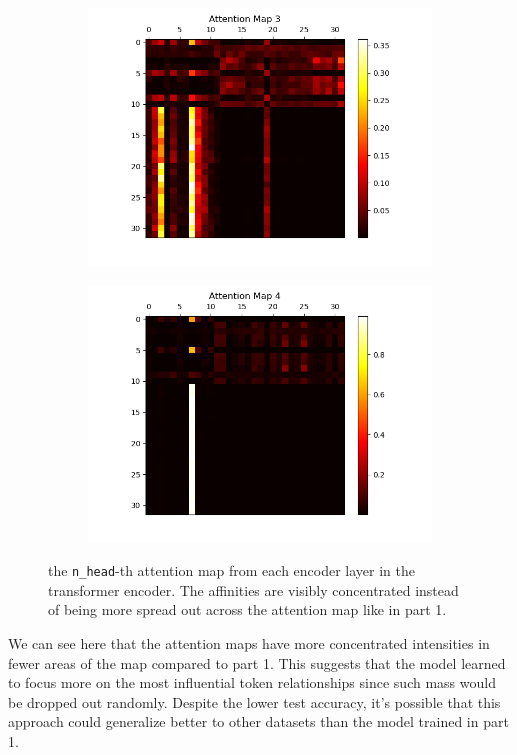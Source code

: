 \documentclass[10pt]{article}
\newcommand{\code}[1]{\texttt{#1}}
\theoremstyle{definition}
\begin{document}
\begin{figure}[H]
\begin{subfigure}[b]{0.35\textwidth}
    \end{subfigure}
    \begin{subfigure}[b]{0.35\textwidth}
        \centering
        \includegraphics[scale=0.4]{../data/plots/part3/attention_map_3.png}
        \label{subfig:am3}
    \end{subfigure}
    \begin{subfigure}[b]{0.35\textwidth}
        \centering
        \includegraphics[scale=0.4]{../data/plots/part3/attention_map_4.png}
        \label{subfig:am4}
    \end{subfigure}
\caption{the \code{n\_head}-th attention map from each encoder layer in the transformer encoder. The affinities are visibly concentrated instead of being more spread out across the attention map like in part 1.}
\end{figure}
\noindent We can see here that the attention maps have more concentrated intensities in fewer areas of the map compared to part 1. This suggests that the model learned to focus more on the most influential token relationships since such mass would be dropped out randomly. Despite the lower test accuracy, it's possible that this approach could generalize better to other datasets than the model trained in part 1.\\
\end{document}
